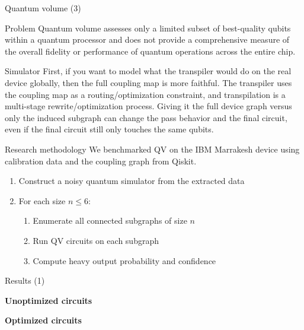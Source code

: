 \documentclass{beamer}
\begin{document}
\begin{Qiskit experiments}
\begin{frame}{Quantum volume (3)}
    \begin{alertblock}{Problem}
        Quantum volume assesses only a limited subset of best-quality qubits within a quantum processor and does not provide a comprehensive measure of the overall fidelity or performance of quantum operations across the entire chip.
    \end{alertblock}
\end{frame}

\begin{frame}{Simulator}
    First, if you want to model what the transpiler would do on the real device globally, then the full coupling map is more faithful. The transpiler uses the coupling map as a routing/optimization constraint, and transpilation is a multi-stage rewrite/optimization process. Giving it the full device graph versus only the induced subgraph can change the pass behavior and the final circuit, even if the final circuit still only touches the same qubits.
\end{frame}


\begin{frame}{Research methodology}
    We benchmarked QV on the IBM Marrakesh device using calibration data and the coupling graph from Qiskit.

    \begin{enumerate}
        \item Construct a noisy quantum simulator from the extracted data
        \item For each size $n \leq 6$:
        \begin{enumerate}
            \item Enumerate all connected subgraphs of size $n$
            \item Run QV circuits on each subgraph
            \item Compute heavy output probability and confidence
        \end{enumerate}
    \end{enumerate}
\end{frame}

\begin{frame}{Results (1)}
    \small

    \textbf{Unoptimized circuits}
    \vspace{0.3em}

    

    \vspace{0.8em}

    \textbf{Optimized circuits}
    \vspace{0.3em}


\end{frame}
\end{Qiskit experiments}
\end{document}
